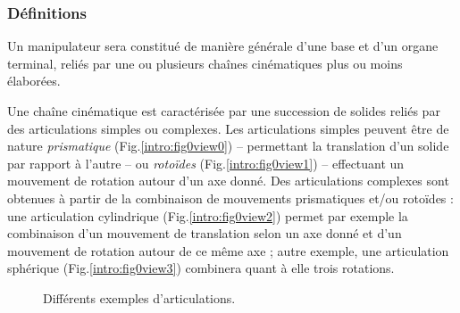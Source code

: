 \subsubsection{Définitions}

Un manipulateur sera constitué de manière générale d'une base et d'un organe terminal, reliés par une ou plusieurs chaînes cinématiques plus ou moins élaborées.

Une chaîne cinématique est caractérisée par une succession de solides reliés par des articulations simples ou complexes. Les articulations simples peuvent être de nature {\it prismatique} (Fig.\ref{intro:fig0view0}) -- permettant la translation d'un solide par rapport à l'autre -- ou {\it rotoïdes} (Fig.\ref{intro:fig0view1}) -- effectuant un mouvement de rotation autour d'un axe donné. Des articulations complexes sont obtenues à partir de la combinaison de mouvements prismatiques et/ou rotoïdes : une articulation cylindrique (Fig.\ref{intro:fig0view2}) permet par exemple la combinaison d'un mouvement de translation selon un axe donné et d'un mouvement de rotation autour de ce même axe ; autre exemple, une articulation sphérique (Fig.\ref{intro:fig0view3}) combinera quant à elle trois rotations.

\begin{figure}[!ht]
  \centering
       \hfill
     \hfill
   \hfill
    \caption{\footnotesize{Différents exemples d'articulations.}}
\label{intro:fig0}
\end{figure}

